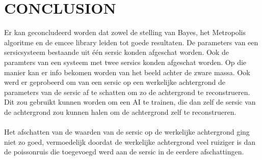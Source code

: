\section{CONCLUSION}
Er kan geconcludeerd worden dat zowel de stelling van Bayes, het Metropolis algoritme en de emcee library leiden tot goede resultaten. De parameters van een sersicsysteem bestaande uit één sersic konden afgeschat worden. Ook de paramters van een systeem met twee sersics konden afgeschat worden. Op die manier kan er info bekomen worden van het beeld achter de zware massa. Ook werd er geprobeerd om van een sersic op een werkelijke achtergrond de parameters van de sersic af te schatten om zo de achtergrond te reconstrueren. Dit zou gebruikt kunnen worden om een AI te trainen, die dan zelf de sersic van de achtergrond zou kunnen halen om de achtergrond zelf te reconstrueren. \\ \\
Het afschatten van de waarden van de sersic op de werkelijke achtergrond ging niet zo goed, vermoedelijk doordat de werkelijke achtergrond veel ruiziger is dan de poissonruis die toegevoegd werd aan de sersic in de eerdere afschattingen. 